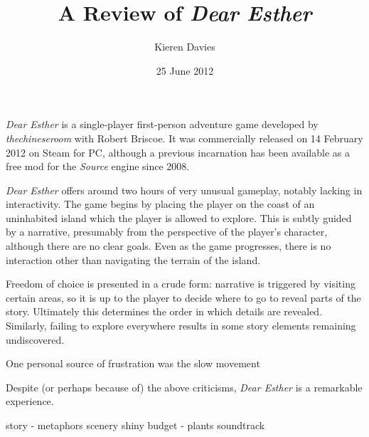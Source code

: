 \documentclass[a4paper,12pt]{article}
\begin{document}
\title{A Review of \emph{Dear Esther}}
\author{Kieren Davies}
\date{25 June 2012}
\maketitle

\emph{Dear Esther} is a single-player first-person adventure game developed by \emph{thechineseroom} with Robert Briscoe.  It was commercially released on 14 February 2012 on Steam for PC, although a previous incarnation has been available as a free mod for the \emph{Source} engine since 2008.

\emph{Dear Esther} offers around two hours of very unusual gameplay, notably lacking in interactivity.  The game begins by placing the player on the coast of an uninhabited island which the player is allowed to explore.  This is subtly guided by a narrative, presumably from the perspective of the player's character, although there are no clear goals.  Even as the game progresses, there is no interaction other than navigating the terrain of the island.

Freedom of choice is presented in a crude form: narrative is triggered by visiting certain areas, so it is up to the player to decide where to go to reveal parts of the story.  Ultimately this determines the order in which details are revealed.  Similarly, failing to explore everywhere results in some story elements remaining undiscovered.

One personal source of frustration was the slow movement

Despite (or perhaps because of) the above criticisms, \emph{Dear Esther} is a remarkable experience.

story - metaphors
scenery
  shiny
  budget - plants
soundtrack
\end{document}

